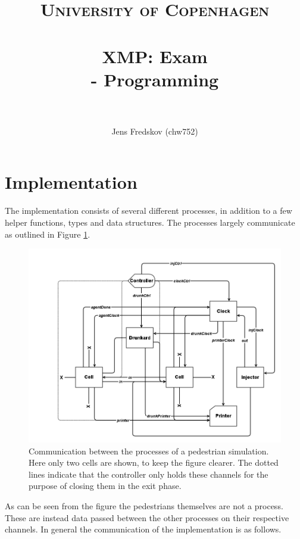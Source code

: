 \documentclass[a4paper, 11pt]{article}
\title{ 
\normalfont \normalsize 
\textsc{University of Copenhagen} \\ [25pt]
\horrule{0.5pt} \\[0.4cm]
\huge XMP: Exam \\ \Large - Programming \\
\horrule{2pt} \\[0.5cm]
}
\author{Jens Fredskov (chw752)}
\begin{document}
\maketitle
\pagebreak

\section{Implementation} %
\label{sec:implementation}
The implementation consists of several different processes, in addition to a few helper functions, types and data structures. The processes largely communicate as outlined in Figure \ref{fig:simulation}.
\begin{figure}[H]
    \centering
   \includegraphics[width=1\textwidth]{pedestrian_simulation.png}
   \caption{Communication between the processes of a pedestrian simulation. Here only two cells are shown, to keep the figure clearer. The dotted lines indicate that the controller only holds these channels for the purpose of closing them in the exit phase.}
\label{fig:simulation}
\end{figure}
As can be seen from the figure the pedestrians themselves are not a process. These are instead data passed between the other processes on their respective channels. In general the communication of the implementation is as follows.
\end{document}
